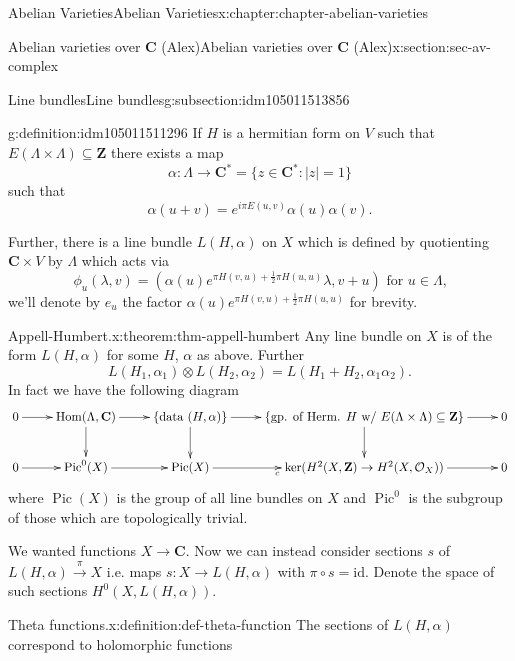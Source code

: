 \documentclass[oneside,10pt,]{book}
\numberwithin{equation}{section}
\newcommand{\sheaf}[1]{\operatorname{\mathcal{#1}}}
\newcommand{\ZZ}{\mathbf{Z}}
\newcommand{\CC}{\mathbf{C}}
\newcommand{\id}{\mathrm{id}}
\DeclareMathOperator{\Hom}{Hom}
\DeclareMathOperator{\Pic}{Pic}
\begin{document}
\begin{chapterptx}{Abelian Varieties}{}{Abelian Varieties}{}{}{x:chapter:chapter-abelian-varieties}
\begin{sectionptx}{Abelian varieties over \(\CC\) (Alex)}{}{Abelian varieties over \(\CC\) (Alex)}{}{}{x:section:sec-av-complex}
\begin{subsectionptx}{Line bundles}{}{Line bundles}{}{}{g:subsection:idm105011513856}
\begin{definition}{}{g:definition:idm105011511296}%
If \(H\) is a hermitian form on \(V\) such that \(E(\Lambda\times\Lambda) \subseteq \ZZ\) there exists a map%
\begin{equation*}
\alpha \colon \Lambda \to \CC^*  = \{z\in \CC^* : |z| = 1\}
\end{equation*}
such that%
\begin{equation*}
\alpha(u + v) = e^{i\pi E(u,v)} \alpha(u) \alpha(v)\text{.}
\end{equation*}
%
\par
Further, there is a line bundle \(L(H, \alpha)\) on \(X\) which is defined by quotienting \(\CC\times V\) by \(\Lambda\) which acts via%
\begin{equation*}
\phi_u(\lambda, v) = (\alpha(u)e^{\pi H(v,u) + \frac12 \pi H(u,u)}\lambda, v+u)\text{ for } u\in \Lambda\text{,}
\end{equation*}
we'll denote by \(e_u\) the factor \(\alpha(u)e^{\pi H(v,u) + \frac12 \pi H(u,u)}\) for brevity.%
\end{definition}
\begin{theorem}{Appell-Humbert.}{}{x:theorem:thm-appell-humbert}%
Any line bundle on \(X\) is of the form \(L(H,\alpha)\) for some \(H\), \(\alpha\) as above. Further%
\begin{equation*}
L(H_1, \alpha_1) \otimes L(H_2, \alpha_2)  = L(H_1+ H_2, \alpha_1\alpha_2)\text{.}
\end{equation*}
In fact we have the following diagram%
\begin{equation*}
\xymatrix{
0 \ar[r] &
\Hom(\Lambda, \CC) \ar[r]\ar[d] &
\{\text{data } (H,\alpha)\} \ar[r]\ar[d] &
\{\text{gp. of Herm. } H \text{ w/ }E(\Lambda\times \Lambda) \subseteq \ZZ\} \ar[r]\ar[d] &
0 \\
0 \ar[r] &
\Pic^0(X) \ar[r] &
\Pic(X) \ar[r]_c &
\ker(H^2(X,\ZZ) \to H^2(X,\sheaf O_X)) \ar[r]&
0
}
\end{equation*}
where \(\Pic(X)\) is the group of all line bundles on \(X\) and \(\Pic^0\) is the subgroup of those which are topologically trivial.%
\end{theorem}
We wanted functions \(X\to \CC\). Now we can instead consider sections \(s\) of \(L(H,\alpha) \xrightarrow{\pi} X\) i.e. maps \(s\colon X\to L(H,\alpha)\) with \(\pi\circ s = \id\). Denote the space of such sections \(H^0(X,L(H,\alpha))\).%
\begin{definition}{Theta functions.}{x:definition:def-theta-function}%
The sections of \(L(H, \alpha)\)  correspond to holomorphic functions%

\end{definition}
\end{subsectionptx}
\end{sectionptx}
\end{chapterptx}
\end{document}
